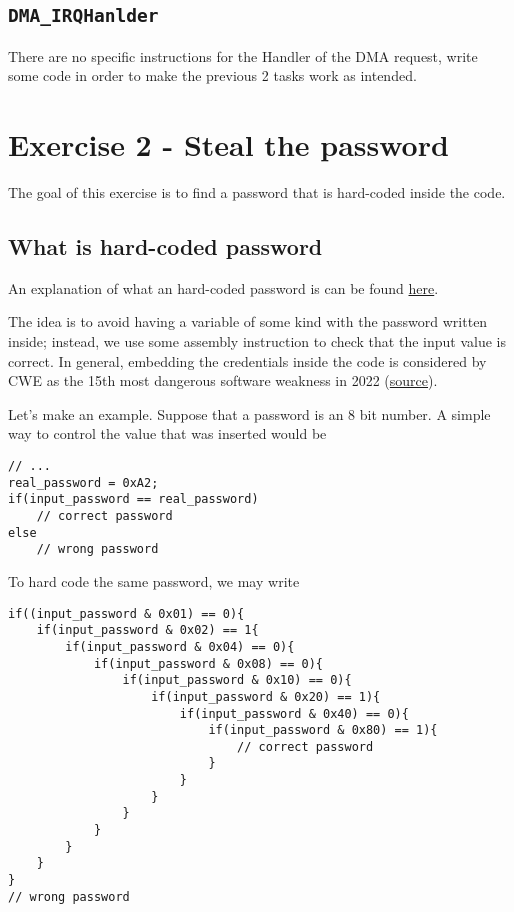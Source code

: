\documentclass[a4paper]{article}
\begin{document}
\subsection{\texttt{DMA\_IRQHanlder}}
There are no specific instructions for the Handler of the DMA request, write some code in order to make the previous 2 tasks work as intended.

\section{Exercise 2 - Steal the password}
The goal of this exercise is to find a password that is hard-coded inside the code. 
\subsection{What is hard-coded password}
An explanation of what an hard-coded password is can be found \href{https://www.beyondtrust.com/resources/glossary/hardcoded-embedded-passwords#:~:text=Hardcoded%20Passwords%2C%20also%20often%20referred,into%20the%20source%20code.}{here}. 

The idea is to avoid having a variable of some kind with the password written inside; instead, we use some assembly instruction to check that the input value is correct. In general, embedding the credentials inside the code is considered by CWE as the 15th most dangerous software weakness in 2022 (\href{https://cwe.mitre.org/top25/archive/2022/2022_cwe_top25.html}{source}).  

Let's make an example. Suppose that a password is an 8 bit number. A simple way to control the value that was inserted would be

\begin{lstlisting}
// ...
real_password = 0xA2;
if(input_password == real_password) 
    // correct password
else
    // wrong password
\end{lstlisting}

To hard code the same password, we may write

\begin{lstlisting}
if((input_password & 0x01) == 0){
    if(input_password & 0x02) == 1{
        if(input_password & 0x04) == 0){
            if(input_password & 0x08) == 0){
                if(input_password & 0x10) == 0){
                    if(input_password & 0x20) == 1){
                        if(input_password & 0x40) == 0){
                            if(input_password & 0x80) == 1){
                                // correct password
                            }
                        }
                    }
                }
            }
        }
    }
}   
// wrong password
\end{lstlisting}
\end{document}
